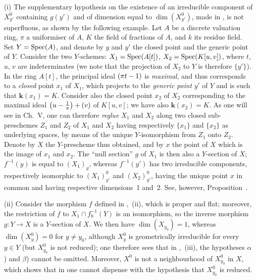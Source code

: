 \begin{remarks}[15.6.10]
\label{IV.15.6.10}
(i)
The supplementary hypothesis on the existence of an irreducible component of $X_{y'}^0$ containing $g(y')$ and of dimension equal to $\dim(X_{y'}^0)$, made in , is not superfluous, as shown by the following example.
Let $A$ be a discrete valuation ring, $\pi$ a uniformiser of $A$, $K$ the field of fractions of $A$, and $k$ its residue field. Set $Y=\operatorname{Spec}(A)$, and denote by $y$ and $y'$ the closed point and the generic point of $Y$.
Consider the two $Y$-schemes: $X_1=\operatorname{Spec}(A[t])$, $X_2=\operatorname{Spec}(K[u,v])$, where $t$, $u$, $v$ are indeterminates (we note that the projection of $X_2$ to $Y$ is therefore $\{y'\}$).
In the ring $A[t]$, the principal ideal $(\pi t- 1)$ is \emph{maximal}, and thus corresponds to a \emph{closed} point $x_1$ of $X_1$, which projects to the \emph{generic point} $y'$ of $Y$ and is such that $\boldsymbol{k}(x_1)=K$.
Consider also the closed point $x_2$ of $X_2$ corresponding to the maximal ideal $\left(u-\frac{1}{\pi}\right)+(v)$ of $K[u,v]$; we have also $\boldsymbol{k}(x_2)=K$.
As one will see in Ch.\ V, one can therefore \emph{reglue} $X_1$ and $X_2$ along two closed sub-preschemes $Z_1$ and $Z_2$ of $X_1$ and $X_2$ having respectively $\{x_1\}$ and $\{x_2\}$ as underlying spaces, by means of the unique $Y$-isomorphism from $Z_1$ onto $Z_2$.
Denote by $X$ the $Y$-prescheme thus obtained, and by $x$ the point of $X$ which is the image of $x_1$ and $x_2$.
The ``null section'' $g$ of $X_1$  is then also a $Y$-section of $X$; $f^{-1}(y)$ is equal to $(X_1)_y$, whereas $f^{-1}(y')$ has two irreducible components, respectively isomorphic to $(X_1)_{y'}^0$ and $(X_2)_{y'}^0$, having the unique point $x$ in common and having respective dimensions~1 and~2. See, however, Proposition~.

(ii)
Consider the morphism $f$ defined in ,~(ii), which is proper and flat; moreover, the restriction of $f$ to $X_1\cap f_0^{-1}(Y)$ is an isomorphism, so the inverse morphism $g:Y\to X$ is a $Y$-section of $X$.
We then have $\dim(X_{y_0})=1$, whereas $\dim(X_y^0)=0$ for $y\neq y_0$, although $X_y^0$ is geometrically irreducible for every $y\in Y$ (but $X_{y_0}^0$ is not reduced); one therefore sees that in ,~(iii), the hypotheses $\alpha$) and $\beta$) cannot be omitted.
Moreover, $X^0$ is not a neighbourhood of $X_{y_0}^0$ in $X$, which shows that in  one cannot dispense with the hypothesis that $X_{y_0}^0$ is reduced.


\end{remarks}
